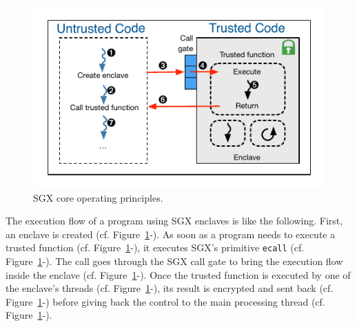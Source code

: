 \begin{figure}[!t]
  \centering
  \includegraphics[width=\linewidth]{images/sgx}
  \caption{SGX core operating principles.}
  \label{fig:sgx}
\end{figure}


The execution flow of a program using SGX enclaves is like the following.
First, an enclave is created (cf. Figure~\ref{fig:sgx}-).
As soon as a program needs to execute a trusted function (cf. Figure~\ref{fig:sgx}-), it executes SGX's primitive \texttt{ecall} (cf. Figure~\ref{fig:sgx}-).
The call goes through the SGX call gate to bring the execution flow inside the enclave (cf. Figure~\ref{fig:sgx}-).
Once the trusted function is executed by one of the enclave's threads (cf. Figure~\ref{fig:sgx}-), its result is encrypted and sent back (cf. Figure~\ref{fig:sgx}-) before giving back the control to the main processing thread (cf. Figure~\ref{fig:sgx}-).
